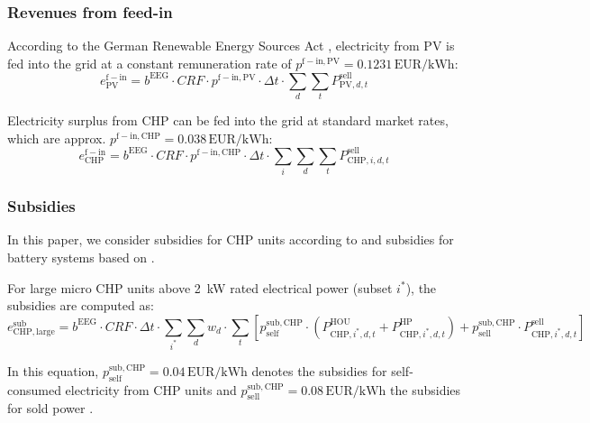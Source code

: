 \subsubsection{Revenues from feed-in}

According to the German Renewable Energy Sources Act \cite{EEG2014}, electricity from PV is fed into the grid at a constant remuneration rate of $p^\mathrm{f-in,PV}=0.1231\,\mathrm{EUR}/\mathrm{kWh}$:
\begin{equation}
	e^\mathrm{f-in}_{\mathrm{PV}} = b^\mathrm{EEG} \cdot CRF \cdot p^\mathrm{f-in,PV} \cdot \Delta t \cdot \sum\limits_{d} \sum\limits_{t} P^{\mathrm{sell}}_{\mathrm{PV},d,t}
\end{equation}

Electricity surplus from CHP can be fed into the grid at standard market rates, which are approx. $p^\mathrm{f-in,CHP}=0.038\,\mathrm{EUR}/\mathrm{kWh}$:
\begin{equation}
	e^\mathrm{f-in}_{\mathrm{CHP}} = b^\mathrm{EEG} \cdot CRF \cdot p^\mathrm{f-in,CHP} \cdot \Delta t \cdot \sum\limits_{i} \sum\limits_{d} \sum\limits_{t} P^{\mathrm{sell}}_{\mathrm{CHP},i,d,t}
\end{equation}

\subsubsection{Subsidies}
\label{ssec:subsidies}

In this paper, we consider subsidies for CHP units according to \cite{KWKG2016} and subsidies for battery systems based on \cite{KfW275_2016}.

For large micro CHP units above 2~kW rated electrical power (subset $i^*$), the subsidies are computed as:
\begin{equation}
	e^\mathrm{sub}_{\mathrm{CHP,large}} = b^\mathrm{EEG} \cdot CRF \cdot \Delta t \cdot \sum\limits_{i^*} \sum\limits_{d} w_d \cdot \sum\limits_{t} \left[p^\mathrm{sub,CHP}_{\mathrm{self}} \cdot \left(P^\mathrm{HOU}_{\mathrm{CHP,}i^*,d,t} + P^\mathrm{HP}_{\mathrm{CHP,}i^*,d,t}\right) + p^\mathrm{sub,CHP}_{\mathrm{sell}} \cdot P^\mathrm{sell}_{\mathrm{CHP,}i^*,d,t}\right]
	\label{eqn:subs_CHP_large}
\end{equation}

In this equation, $p^\mathrm{sub,CHP}_{\mathrm{self}}=0.04\,\mathrm{EUR}/\mathrm{kWh}$ denotes the subsidies for self-consumed electricity from CHP units and $p^\mathrm{sub,CHP}_{\mathrm{sell}}=0.08\,\mathrm{EUR}/\mathrm{kWh}$ the subsidies for sold power \cite{KWKG2016}.

